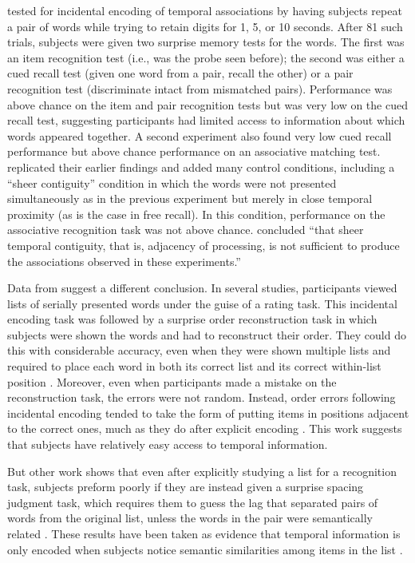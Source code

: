 \documentclass[man,natbib,floatsintext]{apa6} %
\begin{document}
\citet{GlenBrad79} tested for incidental encoding of temporal associations by having subjects repeat a pair of words while trying to retain digits for 1, 5, or 10 seconds. After 81 such trials, subjects were given two surprise memory tests for the words. The first was an item recognition test (i.e., was the probe seen before); the second was either a cued recall test (given one word from a pair, recall the other) or a pair recognition test (discriminate intact from mismatched pairs). Performance was above chance on the item and pair recognition tests but was very low on the cued recall test, suggesting participants had limited access to information about which words appeared together. A second experiment also found very low cued recall performance but above chance performance on an associative matching test. \citet{BradGlen83} replicated their earlier findings and added many control conditions, including a ``sheer contiguity'' condition in which the words were not presented simultaneously as in the previous experiment but merely in close temporal proximity (as is the case in free recall). In this condition, performance on the associative recognition task was not above chance. \citet[][p. 665]{BradGlen83} concluded ``that sheer temporal contiguity, that is, adjacency of processing, is not sufficient to produce the associations observed in these experiments.''

Data from \citet{Nair91, Nair90b} suggest a different conclusion. In several studies, participants viewed lists of serially presented words under the guise of a rating task. This incidental encoding task was followed by a surprise order reconstruction task in which subjects were shown the words and had to reconstruct their order. They could do this with considerable accuracy, even when they were shown multiple lists and required to place each word in both its correct list and its correct within-list position \citep{Nair91}. Moreover, even when participants made a mistake on the reconstruction task, the errors were not random. Instead, order errors following incidental encoding tended to take the form of putting items in positions adjacent to the correct ones, much as they do after explicit encoding \citep{Heal74}. This work suggests that subjects have relatively easy access to temporal information. 

But other work shows that even after explicitly studying a list for a recognition task, subjects preform poorly if they are instead given a surprise spacing judgment task, which requires them to guess the lag that separated pairs of words from the original list, unless the words in the pair were semantically related \citep{HintEtal75,HintBloc73}. These results have been taken as evidence that temporal information is only encoded when subjects notice semantic similarities among items in the list \citep[i.e., study phase retreival]{HintEtal75,HintBloc73,Hint16}.
\end{document}
